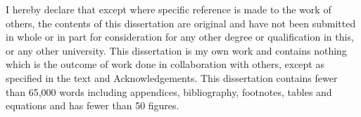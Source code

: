 
\begin{declaration}

I hereby declare that except where specific reference is made to the work of 
others, the contents of this dissertation are original and have not been 
submitted in whole or in part for consideration for any other degree or 
qualification in this, or any other university. This dissertation is my own 
work and contains nothing which is the outcome of work done in collaboration 
with others, except as specified in the text and Acknowledgements. This 
dissertation contains fewer than 65,000 words including appendices, 
bibliography, footnotes, tables and equations and has fewer than 50 figures.


\end{declaration}